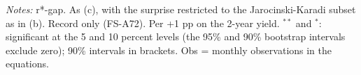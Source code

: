 \begin{flushleft}\footnotesize\textit{Notes:} r*-gap. As (c), with the surprise restricted to the Jarocinski-Karadi subset as in (b). Record only (FS-A72). Per +1 pp on the 2-year yield. $^{**}$ and $^{*}$: significant at the 5 and 10 percent levels (the 95\% and 90\% bootstrap intervals exclude zero); 90\% intervals in brackets. Obs = monthly observations in the equations.\end{flushleft}
\endgroup
